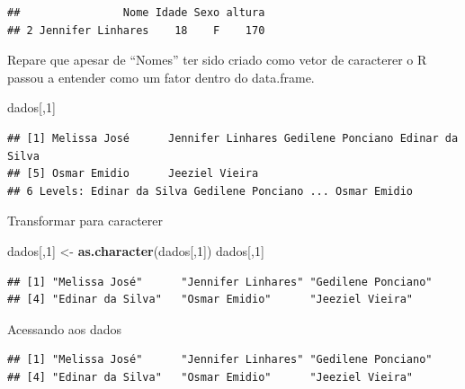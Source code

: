 \documentclass[
]{book}
\newenvironment{Shaded}{\begin{snugshade}}{\end{snugshade}}
\newcommand{\DecValTok}[1]{\textcolor[rgb]{0.00,0.00,0.81}{#1}}
\newcommand{\KeywordTok}[1]{\textcolor[rgb]{0.13,0.29,0.53}{\textbf{#1}}}
\newcommand{\NormalTok}[1]{#1}
\newcommand{\OperatorTok}[1]{\textcolor[rgb]{0.81,0.36,0.00}{\textbf{#1}}}
\newcommand{\StringTok}[1]{\textcolor[rgb]{0.31,0.60,0.02}{#1}}
\begin{document}
\begin{verbatim}
##                Nome Idade Sexo altura
## 2 Jennifer Linhares    18    F    170
\end{verbatim}

Repare que apesar de ``Nomes'' ter sido criado como vetor de caracterer o R passou a entender como um fator dentro do data.frame.

\begin{Shaded}
\begin{Highlighting}[]
\NormalTok{dados[,}\DecValTok{1}\NormalTok{]}
\end{Highlighting}
\end{Shaded}

\begin{verbatim}
## [1] Melissa José      Jennifer Linhares Gedilene Ponciano Edinar da Silva  
## [5] Osmar Emidio      Jeeziel Vieira   
## 6 Levels: Edinar da Silva Gedilene Ponciano ... Osmar Emidio
\end{verbatim}

Transformar para caracterer

\begin{Shaded}
\begin{Highlighting}[]
\NormalTok{dados[,}\DecValTok{1}\NormalTok{] <-}\StringTok{ }\KeywordTok{as.character}\NormalTok{(dados[,}\DecValTok{1}\NormalTok{])}
\NormalTok{dados[,}\DecValTok{1}\NormalTok{]}
\end{Highlighting}
\end{Shaded}

\begin{verbatim}
## [1] "Melissa José"      "Jennifer Linhares" "Gedilene Ponciano"
## [4] "Edinar da Silva"   "Osmar Emidio"      "Jeeziel Vieira"
\end{verbatim}

Acessando aos dados

\begin{Shaded}
\end{Shaded}

\begin{verbatim}
## [1] "Melissa José"      "Jennifer Linhares" "Gedilene Ponciano"
## [4] "Edinar da Silva"   "Osmar Emidio"      "Jeeziel Vieira"
\end{verbatim}

\begin{Shaded}
\end{Shaded}
\end{document}
